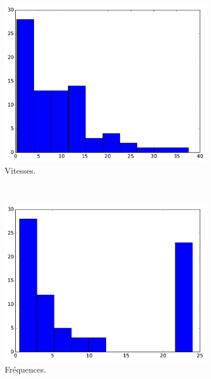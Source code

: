 	\begin{figure}[!htbp]
		\begin{subfigure}[t]{\subImgWclicks}
			\centering
			\includegraphics[width=\textwidth]{figures/ch3/bird_filteredSpeed}
			\caption{Vitesses.}
			\label{fig:bird_filteredSpeed}
		\end{subfigure}
		~
		\begin{subfigure}[t]{\subImgWclicks}
			\centering
			\includegraphics[width=\textwidth]{figures/ch3/bird_frequency}
			\caption{Fréquences.}
			\label{fig:bird_frequency}
		\end{subfigure}
		~
		\begin{subfigure}[t]{\subImgWclicks}

\end{subfigure}
\end{figure}

